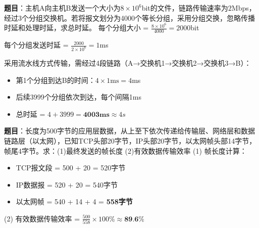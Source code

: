 \begin{examplebox}
\textbf{题目}：主机A向主机B发送一个大小为$8 \times 10^6$bit的文件，链路传输速率为$2$Mbps，经过3个分组交换机。若将报文划分为4000个等长分组，采用分组交换，忽略传播时延和处理时延，求总时延。
\tcblower
每个分组大小 = $\frac{8 \times 10^6}{4000} = 2000$bit

每个分组发送时延 = $\frac{2000}{2 \times 10^6} = 1$ms

采用流水线方式传输，需经过4段链路（A→交换机1→交换机2→交换机3→B）：
\begin{itemize}[itemsep=0pt]
    \item 第1个分组到达B的时间：$4 \times 1\text{ms} = 4$ms
    \item 后续3999个分组依次到达，每个间隔1ms
    \item 总时延 = $4 + 3999 = \textbf{4003ms} \approx 4s$
\end{itemize}
\end{examplebox}

\begin{examplebox}
\textbf{题目}：长度为500字节的应用层数据，从上至下依次传递给传输层、网络层和数据链路层（以太网），已知TCP头部20字节，IP头部20字节，以太网帧头部14字节，帧尾4字节。求：(1)最终发送的帧长度 (2)有效数据传输效率
\tcblower
(1) 帧长度计算：
\begin{itemize}[itemsep=0pt]
    \item TCP报文段 = 500 + 20 = 520字节
    \item IP数据报 = 520 + 20 = 540字节
    \item 以太网帧 = 540 + 14 + 4 = \textbf{558字节}
\end{itemize}

(2) 有效数据传输效率 = $\frac{500}{558} \times 100\% \approx \textbf{89.6\%}$
\end{examplebox}

